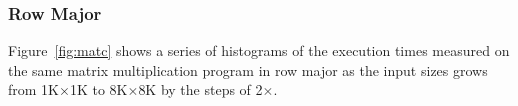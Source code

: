 \documentclass[10pt]{article}
\begin{document}
\subsubsection{Row Major}

Figure~\ref{fig:matc} shows a series of 
histograms of the execution times measured on 
the same matrix multiplication program in row major 
as the input sizes grows from 1K$\times$1K to 8K$\times$8K by the steps of 2{\small $\times$}. 

\pagebreak

\begin{figure}[h]
	\centering
\end{figure}
\end{document}
